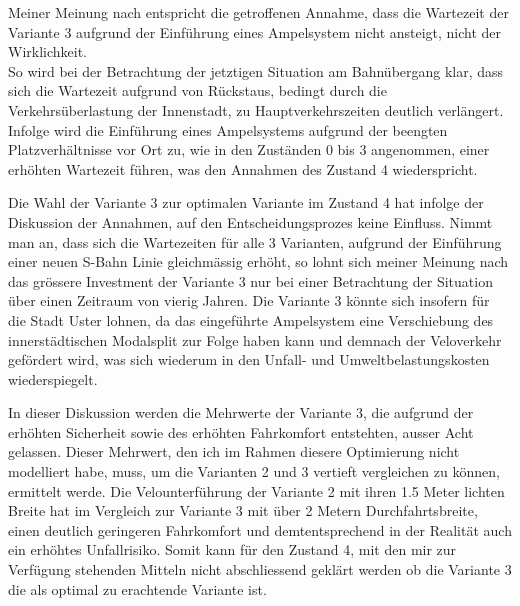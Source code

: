 Meiner Meinung nach entspricht die getroffenen Annahme, dass die Wartezeit der Variante 3 aufgrund der Einführung eines Ampelsystem nicht ansteigt, nicht der Wirklichkeit. \\
So wird bei der Betrachtung der jetztigen Situation am Bahnübergang klar, dass sich die Wartezeit aufgrund von Rückstaus, bedingt durch die Verkehrsüberlastung der Innenstadt, zu Hauptverkehrszeiten deutlich verlängert. Infolge wird die Einführung eines Ampelsystems aufgrund der beengten Platzverhältnisse vor Ort zu, wie in den Zuständen 0 bis 3 angenommen, einer erhöhten Wartezeit führen, was den Annahmen des Zustand 4 wiederspricht.

Die Wahl der Variante 3 zur optimalen Variante im Zustand 4 hat infolge der Diskussion der Annahmen, auf den Entscheidungsprozes keine Einfluss.
Nimmt man an, dass sich die Wartezeiten für alle 3 Varianten, aufgrund der Einführung einer neuen S-Bahn Linie gleichmässig erhöht, so lohnt sich meiner Meinung nach das grössere Investment der Variante 3 nur bei einer Betrachtung der Situation über einen Zeitraum von vierig Jahren. Die Variante 3 könnte sich insofern für die Stadt Uster lohnen, da das eingeführte Ampelsystem eine Verschiebung des innerstädtischen Modalsplit zur Folge haben kann und demnach der Veloverkehr gefördert wird, was sich wiederum in den Unfall- und Umweltbelastungskosten wiederspiegelt.

In dieser Diskussion werden die Mehrwerte der Variante 3, die aufgrund der erhöhten Sicherheit sowie des erhöhten Fahrkomfort entstehten, ausser Acht gelassen. 
Dieser Mehrwert, den ich im Rahmen diesere Optimierung nicht modelliert habe, muss, um die Varianten 2 und 3 vertieft vergleichen zu können, ermittelt werde. Die Velounterführung der Variante 2 mit ihren 1.5 Meter lichten Breite hat im Vergleich zur Variante 3 mit über 2 Metern Durchfahrtsbreite, einen deutlich geringeren Fahrkomfort und demtentsprechend in der Realität auch ein erhöhtes Unfallrisiko. Somit kann für den Zustand 4, mit den mir zur Verfügung stehenden Mitteln nicht abschliessend geklärt werden ob die Variante 3 die als optimal zu erachtende Variante ist.
      

%

